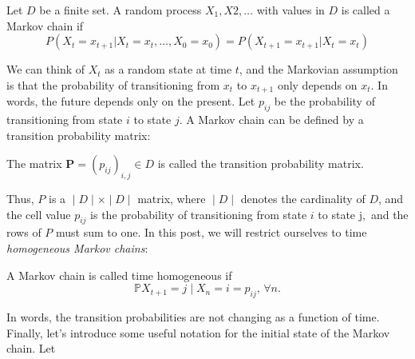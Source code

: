 \begin{definition}
	Let $D$ be a finite set. A random process $X_1, X2,\dots$  with values in $D$ is called a Markov chain if
$$P(X_t=x_{t+1}|X_{t}=x_t,\dots,X_0=x_0)=P(X_{t+1}=x_{t+1}|X_{t}=x_t)$$
\label{def:markov_chain}
\end{definition}
We can think of $X_t$ as a random state at time $t$, and the Markovian assumption is that the probability of transitioning from $x_t$ to $x_{t+1}$ only depends on $x_t$. In words, the future depends only on the present. Let $p_{ij}$ be the probability of transitioning from state $i$ to state $j$. A Markov chain can be defined by a transition probability matrix:
\begin{definition}
	The matrix $\mathbf{P}=(p_{ij})_{i,j}\in D$ is called the transition probability matrix.
\label{def:markov_chain_transition_matrix}
\end{definition}
Thus, $P$ is a $∣D∣\times∣D∣$ matrix, where $∣D∣$ denotes the cardinality of $D$, and the cell value $p_{ij}$ is the probability of transitioning from state $i$ to state j$,$ and the rows of $P$ must sum to one. In this post, we will restrict ourselves to time \textit{homogeneous Markov chains}:

\begin{definition}
A Markov chain is called time homogeneous if 
$$\mathbb{P}{X_{t+1}=j∣X_n=i}=p_{ij},\, \forall n.$$
\end{definition}
In words, the transition probabilities are not changing as a function of time. Finally, let's introduce some useful notation for the initial state of the Markov chain. Let

